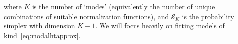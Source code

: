 \documentclass[11pt,twoside,openany]{book}
\renewcommand{\vec}[1]{\boldsymbol{#1}}
\numberwithin{Theorem}{chapter}
\numberwithin{Definition}{chapter}
\numberwithin{Lemma}{chapter}
\numberwithin{Algorithm}{chapter}
\numberwithin{equation}{chapter}
\begin{document}
where $K$ is the number of `modes' (equivalently the number of unique
combinations of suitable normalization functions), and $\mathcal{S}_K$ is the
probability simplex with dimension $K-1$. We will focus
heavily on fitting models of kind~\eqref{eq:modalhtapprox}.\\







\end{document}
